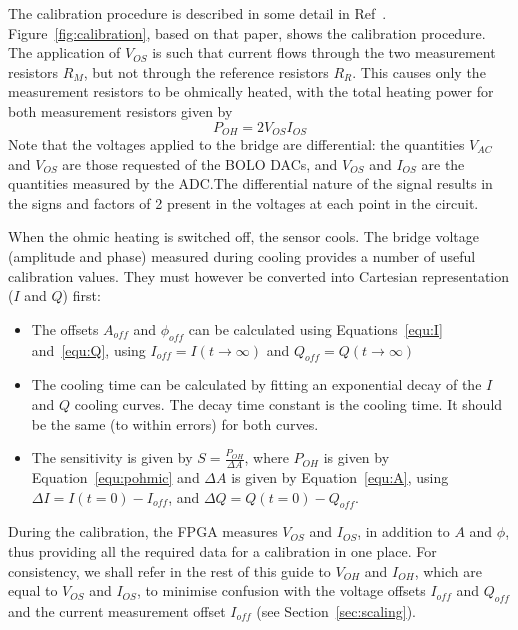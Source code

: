 \documentclass[12pt,a4paper]{article}
\begin{document}
The calibration procedure is described in some detail in Ref~\cite{lovell-2015}. Figure~\ref{fig:calibration}, based on that paper, shows the calibration
procedure. The application of $V_{OS}$ is such that current flows through the two measurement resistors $R_M$, but not through the reference resistors
$R_R$. This causes only the measurement resistors to be ohmically heated, with the total heating power for both measurement resistors given by
\begin{equation}
  \label{equ:pohmic}
  P_{OH} = 2 V_{OS} I_{OS}
\end{equation}
Note that the voltages applied to the bridge are differential: the quantities $V_{AC}$ and $V_{OS}$ are those requested of the BOLO DACs, and $V_{OS}$ and
$I_{OS}$ are the quantities measured by the ADC.\@ The differential nature of the signal results in the signs and factors of 2 present in the voltages at
each point in the circuit.


When the ohmic heating is switched off, the sensor cools. The bridge voltage (amplitude and phase) measured during cooling provides a number of useful
calibration values. They must however be converted into Cartesian representation ($I$ and $Q$) first:
\begin{itemize}
\item{The offsets $A_{off}$ and $\phi_{off}$ can be calculated using Equations~\ref{equ:I} and~\ref{equ:Q}, using $I_{off} = I(t\rightarrow\infty)$ and
    $Q_{off} = Q(t\rightarrow\infty)$}
\item{The cooling time can be calculated by fitting an exponential decay of the $I$ and $Q$ cooling curves. The decay time constant is the cooling time.
    It should be the same (to within errors) for both curves.}
\item{The sensitivity is given by $S = \frac{P_{OH}}{\Delta A}$, where $P_{OH}$ is given by Equation~\ref{equ:pohmic} and $\Delta A$ is given by
    Equation~\ref{equ:A}, using $\Delta I = I(t=0) - I_{off}$, and $\Delta Q = Q(t=0) - Q_{off}$.}
\end{itemize}
During the calibration, the FPGA measures $V_{OS}$ and $I_{OS}$, in addition to $A$ and $\phi$, thus providing all the required data for a
calibration in one place. For consistency, we shall refer in the rest of this guide to $V_{OH}$ and $I_{OH}$, which are equal to $V_{OS}$ and
$I_{OS}$, to minimise confusion with the voltage offsets $I_{off}$ and $Q_{off}$ and the current measurement offset $I_{off}$ (see
Section~\ref{sec:scaling}).
\end{document}
